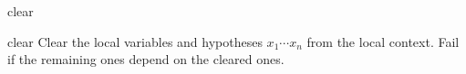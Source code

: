 \begin{tactic}{clear}
  \begin{tsyntax}[empty]{clear}
  Clear the local variables and hypotheses $x_1 \cdots x_n$ from the 
  local context. Fail if the remaining ones depend on the cleared ones.
  \end{tsyntax}
\end{tactic}

